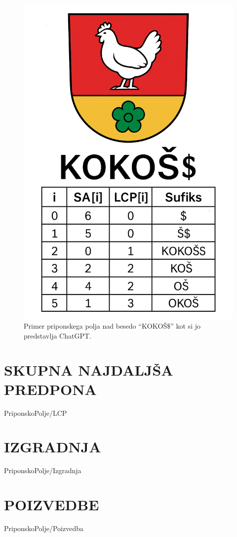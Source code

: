 \begin{figure}[htb]
    \begin{center}
        \includegraphics[width=.5\textwidth]{Slike/ChatGPTSA.png}
        \caption{Primer priponskega polja nad besedo \enquote{KOKOŠ$\$$} kot si jo predstavlja ChatGPT.} 
        \label{fig:ChatGPT}
    \end{center}
\end{figure}



\section{SKUPNA NAJDALJŠA PREDPONA}\label{sec:LCP}
{PriponskoPolje/LCP}

\section{IZGRADNJA}\label{sec:SAIzgradnja}
{PriponskoPolje/Izgradnja}

\section{POIZVEDBE}\label{sec:SAPoizvedbe}
{PriponskoPolje/Poizvedba}